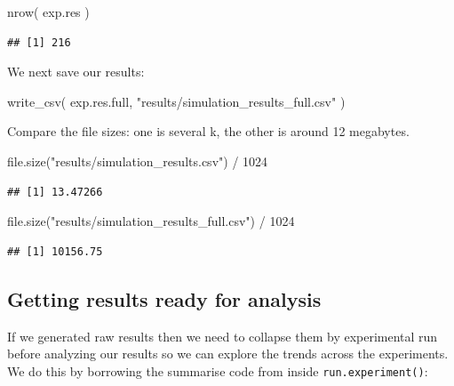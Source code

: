 \documentclass[
]{book}
\newenvironment{Shaded}{\begin{snugshade}}{\end{snugshade}}
\newcommand{\DecValTok}[1]{\textcolor[rgb]{0.00,0.00,0.81}{#1}}
\newcommand{\FunctionTok}[1]{\textcolor[rgb]{0.00,0.00,0.00}{#1}}
\newcommand{\NormalTok}[1]{#1}
\newcommand{\SpecialCharTok}[1]{\textcolor[rgb]{0.00,0.00,0.00}{#1}}
\newcommand{\StringTok}[1]{\textcolor[rgb]{0.31,0.60,0.02}{#1}}
\begin{document}
\begin{Shaded}
\begin{Highlighting}[]
\FunctionTok{nrow}\NormalTok{( exp.res )}
\end{Highlighting}
\end{Shaded}

\begin{verbatim}
## [1] 216
\end{verbatim}

We next save our results:

\begin{Shaded}
\begin{Highlighting}[]
\FunctionTok{write\_csv}\NormalTok{( exp.res.full, }\StringTok{"results/simulation\_results\_full.csv"}\NormalTok{ )}
\end{Highlighting}
\end{Shaded}

Compare the file sizes: one is several k, the other is around 12 megabytes.

\begin{Shaded}
\begin{Highlighting}[]
\FunctionTok{file.size}\NormalTok{(}\StringTok{"results/simulation\_results.csv"}\NormalTok{) }\SpecialCharTok{/} \DecValTok{1024}
\end{Highlighting}
\end{Shaded}

\begin{verbatim}
## [1] 13.47266
\end{verbatim}

\begin{Shaded}
\begin{Highlighting}[]
\FunctionTok{file.size}\NormalTok{(}\StringTok{"results/simulation\_results\_full.csv"}\NormalTok{) }\SpecialCharTok{/} \DecValTok{1024}
\end{Highlighting}
\end{Shaded}

\begin{verbatim}
## [1] 10156.75
\end{verbatim}

\hypertarget{getting-results-ready-for-analysis}{%
\subsection{Getting results ready for analysis}\label{getting-results-ready-for-analysis}}

If we generated raw results then we need to collapse them by experimental run
before analyzing our results so we can explore the trends across the
experiments. We do this by borrowing the summarise code from inside
\texttt{run.experiment()}:
\end{document}
